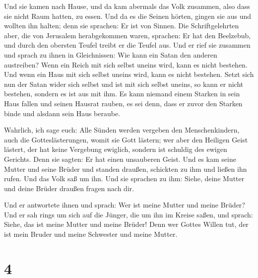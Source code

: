  Und sie kamen nach Hause, und da kam abermals das Volk
zusammen, also dass sie nicht Raum hatten, zu essen.  Und
da es die Seinen hörten, gingen sie aus und wollten ihn halten; denn sie
sprachen: Er ist von Sinnen.  Die Schriftgelehrten aber,
die von Jerusalem herabgekommen waren, sprachen: Er hat den Beelzebub,
und durch den obersten Teufel treibt er die Teufel aus. 
Und er rief sie zusammen und sprach zu ihnen in Gleichnissen: Wie kann
ein Satan den anderen austreiben?  Wenn ein Reich mit
sich selbst uneins wird, kann es nicht bestehen.  Und
wenn ein Haus mit sich selbst uneins wird, kann es nicht bestehen.
 Setzt sich nun der Satan wider sich selbst und ist mit
sich selbst uneins, so kann er nicht bestehen, sondern es ist aus mit
ihm.  Es kann niemand einem Starken in sein Haus fallen
und seinen Hausrat rauben, es sei denn, dass er zuvor den Starken binde
und alsdann sein Haus beraube.

 Wahrlich, ich sage euch: Alle Sünden werden vergeben den
Menschenkindern, auch die Gotteslästerungen, womit sie Gott lästern;
 wer aber den Heiligen Geist lästert, der hat keine
Vergebung ewiglich, sondern ist schuldig des ewigen Gerichts.
 Denn sie sagten: Er hat einen unsauberen Geist.
 Und es kam seine Mutter und seine Brüder und standen
draußen, schickten zu ihm und ließen ihn rufen.  Und das
Volk saß um ihn. Und sie sprachen zu ihm: Siehe, deine Mutter und deine
Brüder draußen fragen nach dir.

 Und er antwortete ihnen und sprach: Wer ist meine Mutter
und meine Brüder?  Und er sah rings um sich auf die
Jünger, die um ihn im Kreise saßen, und sprach: Siehe, das ist meine
Mutter und meine Brüder!  Denn wer Gottes Willen tut, der
ist mein Bruder und meine Schwester und meine Mutter.

\hypertarget{section-3}{%
\section{4}\label{section-3}}

